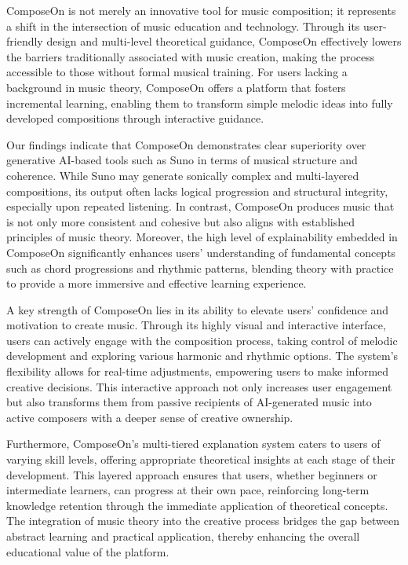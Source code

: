 ComposeOn is not merely an innovative tool for music composition; it represents a shift in the intersection of music education and technology. Through its user-friendly design and multi-level theoretical guidance, ComposeOn effectively lowers the barriers traditionally associated with music creation, making the process accessible to those without formal musical training. For users lacking a background in music theory, ComposeOn offers a platform that fosters incremental learning, enabling them to transform simple melodic ideas into fully developed compositions through interactive guidance.

Our findings indicate that ComposeOn demonstrates clear superiority over generative AI-based tools such as Suno in terms of musical structure and coherence. While Suno may generate sonically complex and multi-layered compositions, its output often lacks logical progression and structural integrity, especially upon repeated listening. In contrast, ComposeOn produces music that is not only more consistent and cohesive but also aligns with established principles of music theory. Moreover, the high level of explainability embedded in ComposeOn significantly enhances users' understanding of fundamental concepts such as chord progressions and rhythmic patterns, blending theory with practice to provide a more immersive and effective learning experience.

A key strength of ComposeOn lies in its ability to elevate users' confidence and motivation to create music. Through its highly visual and interactive interface, users can actively engage with the composition process, taking control of melodic development and exploring various harmonic and rhythmic options. The system’s flexibility allows for real-time adjustments, empowering users to make informed creative decisions. This interactive approach not only increases user engagement but also transforms them from passive recipients of AI-generated music into active composers with a deeper sense of creative ownership.

Furthermore, ComposeOn’s multi-tiered explanation system caters to users of varying skill levels, offering appropriate theoretical insights at each stage of their development. This layered approach ensures that users, whether beginners or intermediate learners, can progress at their own pace, reinforcing long-term knowledge retention through the immediate application of theoretical concepts. The integration of music theory into the creative process bridges the gap between abstract learning and practical application, thereby enhancing the overall educational value of the platform.
